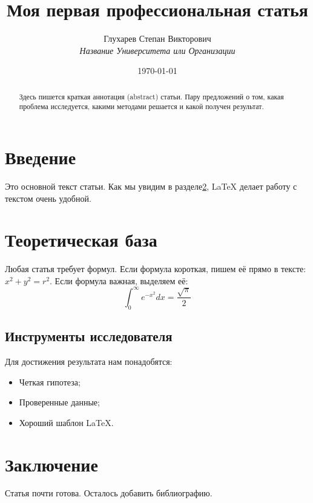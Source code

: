 \documentclass[12pt, a4paper]{article}
\title{\textbf{Моя первая профессиональная статья}}
\author{Глухарев Степан Викторович \\ \textit{Название Университета или Организации}}
\date{\today}
\begin{document}
    \maketitle

    \begin{abstract}
        Здесь пишется краткая аннотация (abstract) статьи.
        Пару предложений о том, какая проблема исследуется, какими методами решается и какой получен результат.
    \end{abstract}

    \tableofcontents
    \newpage

    \section{Введение}\label{sec:intro}
    Это основной текст статьи. Как мы увидим в разделе\ref{sec:theory}, LaTeX делает работу с текстом очень удобной.


    \section{Теоретическая база}\label{sec:theory}
    Любая статья требует формул. Если формула короткая, пишем её прямо в тексте: $x^2 + y^2 = r^2$.
    Если формула важная, выделяем её:
    \begin{equation}\label{eq:integral}
        \int_{0}^{\infty} e^{-x^2} dx = \frac{\sqrt{\pi}}{2}
    \end{equation}

    \subsection{Инструменты исследователя}
    Для достижения результата нам понадобятся:
    \begin{itemize}
        \item Четкая гипотеза;
        \item Проверенные данные;
        \item Хороший шаблон LaTeX.
    \end{itemize}


    \section{Заключение}
    Статья почти готова. Осталось добавить библиографию.
\end{document}
